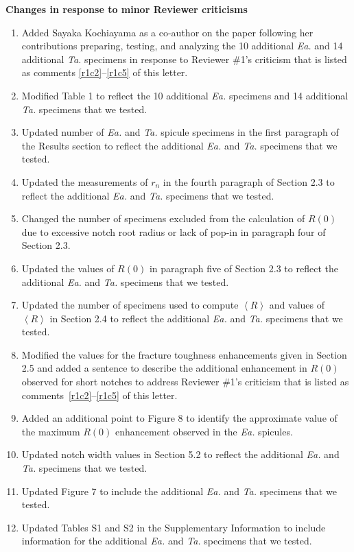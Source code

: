 \documentclass[11pt,letterpaper]{report}
\makeatletter
\newcommand{\TA}{\textit{Ta.\@}\xspace}
\newcommand{\EA}{\textit{Ea.\@}\xspace}
\makeatother
\begin{document}
\clearpage
{\bf Changes in response to minor Reviewer criticisms}
\begin{enumerate}[label=\textit{mc.\arabic*}]
%
\item \label{mc00} Added Sayaka Kochiayama as a co-author on the paper following her contributions preparing, testing, and analyzing the 10 additional \EA and 14 additional \TA specimens in response to Reviewer \#1's criticism that is listed as comments \ref{r1c2}--\ref{r1c5} of this letter.
%
\item \label{mc01} Modified Table 1 to reflect the 10 additional \EA specimens and 14 additional \TA specimens that we tested.
%
\item \label{mc02} Updated number of \EA and \TA spicule specimens in the first paragraph of the Results section to reflect the additional \EA and \TA specimens that we tested.
%
\item \label{mc03} Updated the measurements of $r_n$ in the fourth paragraph of Section 2.3 to reflect the additional \EA and \TA specimens that we tested.
%
\item \label{mc04} Changed the number of specimens excluded from the calculation of $R(0)$ due to excessive notch root radius or lack of pop-in in paragraph four of Section 2.3.
%
\item \label{mc05} Updated the values of $R(0)$ in paragraph five of Section 2.3 to reflect the additional \EA and \TA specimens that we tested.
%
\item \label{mc06} Updated the number of specimens used to compute $\left< R \right>$ and values of $\left< R \right>$ in Section 2.4 to reflect the additional \EA and \TA specimens that we tested.
%
\item \label{mc07} Modified the values for the fracture toughness enhancements given in Section 2.5 and added a sentence to describe the additional enhancement in $R(0)$ observed for short notches to address Reviewer \#1's criticism that is listed as comments~\ref{r1c2}--\ref{r1c5} of this letter.
%
\item \label{mc08} Added an additional point to Figure 8 to identify the approximate value of the maximum $R(0)$ enhancement observed in the \EA spicules.
%
\item \label{mc09} Updated notch width values in Section 5.2 to reflect the additional \EA and \TA specimens that we tested.
%
\item \label{mc010} Updated Figure 7 to include the additional \EA and \TA specimens that we tested.
%
\item \label{mc011} Updated Tables S1 and S2 in the Supplementary Information to include information for the additional \EA and \TA specimens that we tested.

\end{enumerate}
\end{document}
